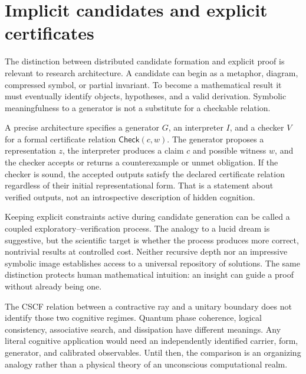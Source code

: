 \section{Implicit candidates and explicit certificates}\label{section:ai:implicit-candidates-and-explicit-certificates}
The distinction between distributed candidate formation and explicit proof is relevant to research architecture. A candidate can begin as a metaphor, diagram, compressed symbol, or partial invariant. To become a mathematical result it must eventually identify objects, hypotheses, and a valid derivation. Symbolic meaningfulness to a generator is not a substitute for a checkable relation.

A precise architecture specifies a generator $G$, an interpreter $I$, and a checker $V$ for a formal certificate relation $\mathsf{Check}(c,w)$. The generator proposes a representation $z$, the interpreter produces a claim $c$ and possible witness $w$, and the checker accepts or returns a counterexample or unmet obligation. If the checker is sound, the accepted outputs satisfy the declared certificate relation regardless of their initial representational form. That is a statement about verified outputs, not an introspective description of hidden cognition.

Keeping explicit constraints active during candidate generation can be called a coupled exploratory--verification process. The analogy to a lucid dream is suggestive, but the scientific target is whether the process produces more correct, nontrivial results at controlled cost. Neither recursive depth nor an impressive symbolic image establishes access to a universal repository of solutions. The same distinction protects human mathematical intuition: an insight can guide a proof without already being one.

The CSCF relation between a contractive ray and a unitary boundary does not identify those two cognitive regimes. Quantum phase coherence, logical consistency, associative search, and dissipation have different meanings. Any literal cognitive application would need an independently identified carrier, form, generator, and calibrated observables. Until then, the comparison is an organizing analogy rather than a physical theory of an unconscious computational realm.

